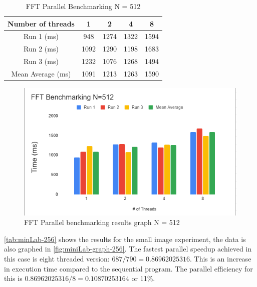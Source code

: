 \begin{table}[htbp]
        \centering
        \begin{tabular}{|c|c|c|c|c|}
        \hline
        \textbf{Number of threads} & \textbf{1} & \textbf{2} & \textbf{4} & \textbf{8} \\
        \hline
        Run 1 (ms) & 948 & 1274 & 1322 & 1594 \\
        \hline
        Run 2 (ms) & 1092 & 1290 & 1198 & 1683 \\
        \hline
        Run 3 (ms) & 1232 & 1076 & 1268 & 1494 \\
        \hline
        Mean Average (ms) & 1091 & 1213 & 1263 & 1590 \\
        \hline
        
                                  
        \end{tabular}
        \caption{FFT Parallel Benchmarking N = 512}
        \label{tab:minLab-512}
\end{table}  
\begin{figure}[H] 
    \centering
    \includegraphics[width=0.9\columnwidth]{Figures/Report/graph 512.png}
    \caption{FFT Parallel benchmarking results graph N = 512 }
    \label{fig:miniLab-graph-512}
\end{figure}
   

\autoref{tab:minLab-256} shows the results for the small image experiment, the data is also graphed in \autoref{fig:miniLab-graph-256}. The fastest parallel speedup achieved in this case is eight threaded version: $687/790 = 0.86962025316$. This is an increase in execution time compared to the sequential program. The parallel efficiency for this is $0.86962025316 / 8 = 0.10870253164$ or 11\%.

